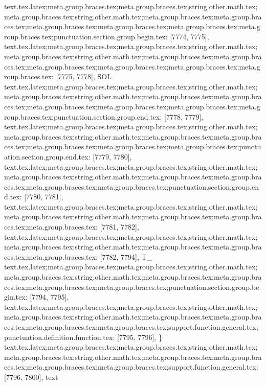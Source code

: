 {{{{{{{{{{{{{{{{{{{{{{{{{{{{{{{{{{{{{{{{{{{{{{{{{{{{{{{{{{{{{{{{{{{{{{{{{{{{{{{{{{{{{{{{{{{{{{{{{{{{{{{{{{{{{{{{{{{{{{{{{{{{{{{{{{{{{{{{{{{{{{{{{{{{{{{{{{{{{{{{{{{{{{{{{{{{{{{{{{{{{{{{{{{{{{{{{{{{{{{{{{{{{{{{{{{{{{{{{{{{{{{{{{{{{{text.tex.latex;meta.group.braces.tex;meta.group.braces.tex;string.other.math.tex;meta.group.braces.tex;string.other.math.tex;meta.group.braces.tex;meta.group.braces.tex;meta.group.braces.tex;meta.group.braces.tex;meta.group.braces.tex;meta.group.braces.tex;punctuation.section.group.begin.tex: [7774, 7775], {{}
text.tex.latex;meta.group.braces.tex;meta.group.braces.tex;string.other.math.tex;meta.group.braces.tex;string.other.math.tex;meta.group.braces.tex;meta.group.braces.tex;meta.group.braces.tex;meta.group.braces.tex;meta.group.braces.tex;meta.group.braces.tex: [7775, 7778], {SOL}
text.tex.latex;meta.group.braces.tex;meta.group.braces.tex;string.other.math.tex;meta.group.braces.tex;string.other.math.tex;meta.group.braces.tex;meta.group.braces.tex;meta.group.braces.tex;meta.group.braces.tex;meta.group.braces.tex;meta.group.braces.tex;punctuation.section.group.end.tex: [7778, 7779], {}}
text.tex.latex;meta.group.braces.tex;meta.group.braces.tex;string.other.math.tex;meta.group.braces.tex;string.other.math.tex;meta.group.braces.tex;meta.group.braces.tex;meta.group.braces.tex;meta.group.braces.tex;meta.group.braces.tex;punctuation.section.group.end.tex: [7779, 7780], {}}
text.tex.latex;meta.group.braces.tex;meta.group.braces.tex;string.other.math.tex;meta.group.braces.tex;string.other.math.tex;meta.group.braces.tex;meta.group.braces.tex;meta.group.braces.tex;meta.group.braces.tex;punctuation.section.group.end.tex: [7780, 7781], {}}
text.tex.latex;meta.group.braces.tex;meta.group.braces.tex;string.other.math.tex;meta.group.braces.tex;string.other.math.tex;meta.group.braces.tex;meta.group.braces.tex;meta.group.braces.tex: [7781, 7782], {
}
text.tex.latex;meta.group.braces.tex;meta.group.braces.tex;string.other.math.tex;meta.group.braces.tex;string.other.math.tex;meta.group.braces.tex;meta.group.braces.tex;meta.group.braces.tex: [7782, 7794], {          T_}
text.tex.latex;meta.group.braces.tex;meta.group.braces.tex;string.other.math.tex;meta.group.braces.tex;string.other.math.tex;meta.group.braces.tex;meta.group.braces.tex;meta.group.braces.tex;meta.group.braces.tex;punctuation.section.group.begin.tex: [7794, 7795], {{}
text.tex.latex;meta.group.braces.tex;meta.group.braces.tex;string.other.math.tex;meta.group.braces.tex;string.other.math.tex;meta.group.braces.tex;meta.group.braces.tex;meta.group.braces.tex;meta.group.braces.tex;support.function.general.tex;punctuation.definition.function.tex: [7795, 7796], {\}
text.tex.latex;meta.group.braces.tex;meta.group.braces.tex;string.other.math.tex;meta.group.braces.tex;string.other.math.tex;meta.group.braces.tex;meta.group.braces.tex;meta.group.braces.tex;meta.group.braces.tex;support.function.general.tex: [7796, 7800], {text}
}}}}}}}}}}}}}}}}}}}}}}}}}}}}}}}}}}}}}}}}}}}}}}}}}}}}}}}}}}}}}}}}}}}}}}}}}}}}}}}}}}}}}}}}}}}}}}}}}}}}}}}}}}}}}}}}}}}}}}}}}}}}}}}}}}}}}}}}}}}}}}}}}}}}}}}}}}}}}}}}}}}}}}}}}}}}}}}}}}}}}}}}}}}}}}}}}}}}}}}}}}}}}}}}}}}}}}}}}}}}}}}}}}}}}}

